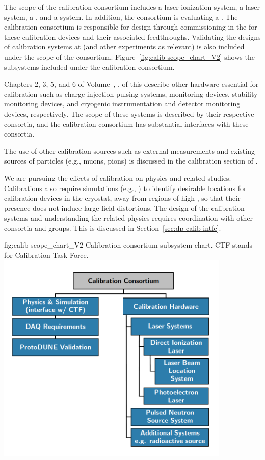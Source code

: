 The scope of the calibration consortium includes a laser ionization system, a \phel laser system, a , and a  system. In addition, the consortium is evaluating a . The calibration consortium is responsible for design through commissioning in the  for these calibration devices and their associated feedthroughs. Validating the designs of calibration systems at  (and other experiments as relevant) is also included under the scope of the consortium. Figure~\ref{fig:calib-scope_chart_V2} shows the subsystems included under the calibration consortium. 

Chapters 2, 3, 5, and 6 of Volume~\volnumberdp{}, \voltitledp{}, of this  describe other hardware essential for calibration such as  charge injection pulsing systems,  monitoring devices,  stability monitoring devices, and cryogenic instrumentation and detector monitoring devices, respectively. The scope of these systems is described by their respective consortia, and the calibration consortium has substantial interfaces with these consortia. 

The use of other calibration sources such as external measurements and existing sources of particles (e.g., muons, pions) is discussed in the calibration section of  \physchtools. 

We are pursuing the effects of calibration on physics and related studies. %
Calibrations also require simulations (e.g., \efield) to identify desirable locations for calibration devices in the cryostat, away from regions of high \efield, so that their presence does not induce large field distortions. 
The design of the calibration systems and understanding the related physics requires coordination with other consortia and groups. This is discussed in Section~\ref{sec:dp-calib-intfc}.

\begin{dunefigure}{fig:calib-scope_chart_V2}
{Calibration consortium subsystem chart. CTF stands for Calibration Task Force.}
\includegraphics[height=4.0in]{graphics/calib-scope_chart_v3.png}
\end{dunefigure}
